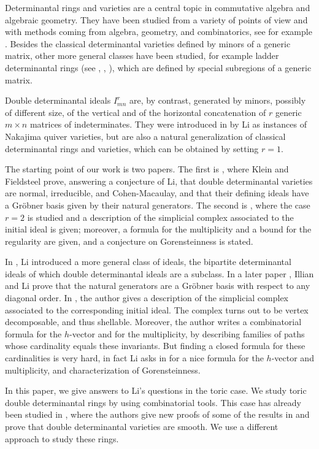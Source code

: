 \documentclass[12pt]{amsart}
\numberwithin{equation}{section}
\theoremstyle{definition}
\begin{document}
Determinantal rings and varieties are a central topic in commutative algebra and algebraic geometry. They have been studied from a variety of points of view and with methods coming from algebra, geometry, and combinatorics, see for example \cite{BCRV}.
Besides the classical determinantal varieties defined by minors of a generic matrix, other more general classes have been studied, for example ladder determinantal rings (see \cite{C}, \cite{GM}, \cite{G}), which are defined by special subregions of a generic matrix. 

Double determinantal ideals $I_{mn}^r$ are, by contrast, generated by minors, possibly of different size, of the vertical and of the horizontal concatenation of $r$ generic $m\times n$ matrices of indeterminates. They were introduced in \cite{L1} by Li as instances of Nakajima quiver varieties, but are also a natural generalization of classical determinantal rings and varieties, which can be obtained by setting $r=1$.

The starting point of our work is two papers. The first is \cite{FK}, where Klein and Fieldsteel prove, answering a conjecture of Li, that double determinantal varieties are normal, irreducible, and Cohen-Macaulay, and that their defining ideals have a Gr\"obner basis given by their natural generators. The second is \cite{CDS}, where the case $r=2$ is studied and a description of the simplicial complex associated to the initial ideal is given; moreover, a formula for the multiplicity and a bound for the regularity are given, and a conjecture on Gorensteinness is stated. 

In \cite{L}, Li introduced a more general class of ideals, the bipartite determinantal ideals of which double determinantal ideals are a subclass. In a later paper \cite{IL}, Illian and Li prove that the natural generators are a Gröbner basis with respect to any diagonal order. In \cite{L}, the author gives a description of the simplicial complex associated to the corresponding initial ideal. The complex turns out to be vertex decomposable, and thus shellable. Moreover, the author writes a combinatorial formula for the $h$-vector and for the multiplicity, by describing families of paths whose cardinality equals these invariants. But finding a closed formula for these cardinalities is very hard, in fact Li asks in \cite[Sections 5.3.2,5.3.3]{L} for a nice formula for the $h$-vector and multiplicity, and characterization of Gorensteinness. 

In this paper, we give answers to Li's questions in the toric case.
We study toric double determinantal rings by using combinatorial tools. This case has already been studied in \cite{BKMM}, where the authors give new proofs of some of the results in \cite{FK} and prove that double determinantal varieties are smooth. We use a different approach to study these rings.
\end{document}
